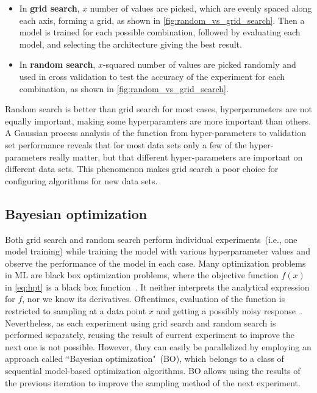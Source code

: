 \begin{itemize}[noitemsep]
    \item In \textbf{grid search}, $x$ number of values are picked, which are evenly spaced along each axis, forming a grid, as shown in \cref{fig:random_vs_grid_search}. Then a model is trained for each possible combination, followed by evaluating each model, and selecting the architecture giving the best result.
    \item In \textbf{random search}, $x$-squared number of values are picked randomly and used in cross validation to test the accuracy of the experiment for each combination, as shown in \cref{fig:random_vs_grid_search}.
\end{itemize}

\hspace*{3.5mm} Random search is better than grid search for most cases, hyperparameters are not equally important, making some hyperparamters are more important than others. A Gaussian process analysis of the function from hyper-parameters to validation set performance reveals that for most data sets only a few of the hyper-parameters really matter, but that different hyper-parameters are important on different data sets. This phenomenon makes grid search a poor choice for configuring algorithms for new data sets. %

\subsection{Bayesian optimization} 
Both grid search and random search perform individual experiments~(i.e., one model training) while training the model with various hyperparameter values and observe the performance of the model in each case. Many optimization problems in ML are black box optimization problems, where the objective function $f(x)$ in \cref{eq:hpt} is a black box function~\cite{BO}. It neither interprets the analytical expression for $f$, nor we know its derivatives. Oftentimes, evaluation of the function is restricted to sampling at a data point $x$ and getting a possibly noisy response~\cite{BO}.
Nevertheless, as each experiment using grid search and random search is performed separately, reusing the result of current experiment to improve the next one is not possible. However, they can easily be parallelized by employing an approach called ``Bayesian optimization"~(BO), which belongs to a class of sequential model-based optimization algorithms. BO allows using the results of the previous iteration to improve the sampling method of the next experiment.

